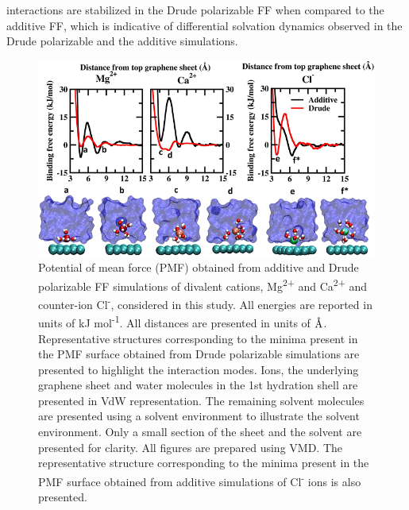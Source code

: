 interactions are stabilized in the Drude polarizable FF when compared to the additive FF, which is indicative of differential solvation dynamics observed in the Drude polarizable and the additive simulations.

\begin{figure}
    \centering
    \includegraphics[width=\textwidth]{Chapter3/Figures/Figure3.png}
    \caption[Potential of mean force (PMF) obtained from additive and Drude polarizable FF simulations of divalentvalent cations and Cl\textsuperscript{-} considered in this study. Representative structures corresponding to the minima present in the PMF surface obtained from Drude polarizable simulations are also presented to highlight the interaction modes]{Potential of mean force (PMF) obtained from additive and Drude polarizable FF simulations of divalent cations, Mg\textsuperscript{2+} and Ca\textsuperscript{2+} and counter-ion Cl\textsuperscript{-}, considered in this study. All energies are reported in units of kJ mol\textsuperscript{-1}. All distances are presented in units of $\text{\normalfont\AA}$. Representative structures corresponding to the minima present in the PMF surface obtained from Drude polarizable simulations are presented to highlight the interaction modes. Ions, the underlying graphene sheet and water molecules in the 1st hydration shell are presented in VdW representation. The remaining solvent molecules are presented using a solvent environment to illustrate the solvent environment. Only a small section of the sheet and the solvent are presented for clarity. All figures are prepared using VMD.\supercite{humphrey_vmd_1996} The representative structure corresponding to the minima present in the PMF surface obtained from additive simulations of Cl\textsuperscript{-} ions is also presented.}
\end{figure}

